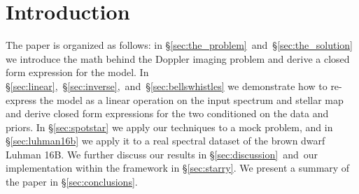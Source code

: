 \documentclass[modern]{aastex631}
\begin{document}
\section{Introduction}


The paper is organized as follows: in \S\ref{sec:the_problem}~and~\S\ref{sec:the_solution} we introduce the math behind the Doppler imaging problem and derive a closed form expression for the model. 
In \S\ref{sec:linear},~\S\ref{sec:inverse},~and~\S\ref{sec:bellswhistles} we demonstrate how to re-express the model as a linear operation on the input spectrum and stellar map and derive closed form expressions for the two conditioned on the data and priors.
In \S\ref{sec:spotstar} we apply our techniques to a mock problem, and in \S\ref{sec:luhman16b} we apply it to a real spectral dataset of the brown dwarf Luhman 16B.
We further discuss our results in \S\ref{sec:discussion}~and~our implementation within the \starry framework in \S\ref{sec:starry}.
We present a summary of the paper in \S\ref{sec:conclusions}. 
\end{document}
